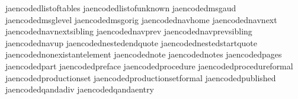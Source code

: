    jaencodedlistoftables          {}
   jaencodedlistofunknown         {}
   jaencodedmsgaud                {}
   jaencodedmsglevel              {}
   jaencodedmsgorig               {}
   jaencodednavhome               {}
   jaencodednavnext               {}
   jaencodednavnextsibling        {}
   jaencodednavprev               {}
   jaencodednavprevsibling        {}
   jaencodednavup                 {}
   jaencodednestedendquote        {}
   jaencodednestedstartquote      {}
   jaencodednonexistantelement    {}
   jaencodednote                  {}
   jaencodednotes                 {}
   jaencodedpages                 {}
   jaencodedpart                  {}
   jaencodedpreface               {}
   jaencodedprocedure             {}
   jaencodedprocedureformal       {}
   jaencodedproductionset         {}
   jaencodedproductionsetformal   {}
   jaencodedpublished             {}
   jaencodedqandadiv              {}
   jaencodedqandaentry            {}
